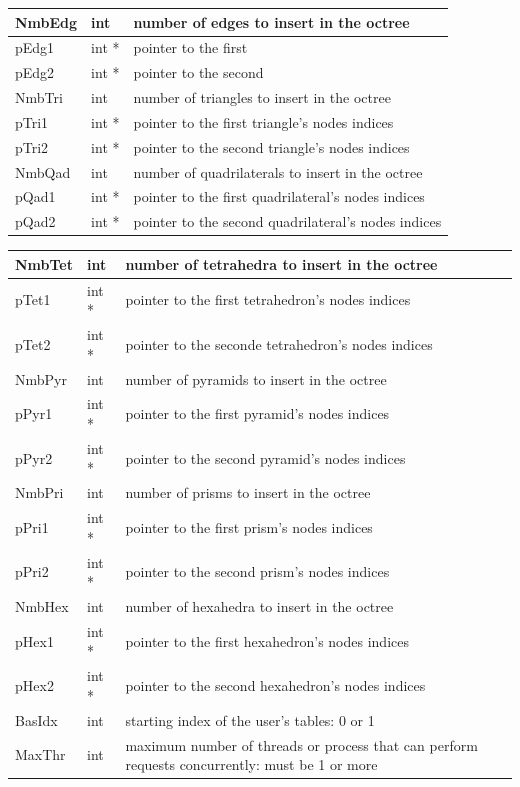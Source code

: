 \documentclass[a4paper,12pt]{article}
\begin{document}
\begin{tabular}{|m{2cm}|m{2cm}|m{10cm}|}
\hline
NmbEdg     & int      & number of edges to insert in the octree  \\
\hline
pEdg1      & int *    & pointer to the first  \\
\hline
pEdg2      & int *    & pointer to the second \\
\hline
NmbTri     & int      & number of triangles to insert in the octree \\
\hline
pTri1      & int *    & pointer to the first triangle's nodes indices \\
\hline
pTri2      & int *    & pointer to the second triangle's nodes indices \\
\hline
NmbQad     & int      & number of quadrilaterals to insert in the octree \\
\hline
pQad1      & int *    & pointer to the first quadrilateral's nodes indices \\
\hline
pQad2      & int *    & pointer to the second quadrilateral's nodes indices \\
\hline
\end{tabular}

\begin{tabular}{|m{2cm}|m{2cm}|m{10cm}|}
\hline
NmbTet     & int      & number of tetrahedra to insert in the octree \\
\hline
pTet1      & int *    & pointer to the first tetrahedron's nodes indices \\
\hline
pTet2      & int *    & pointer to the seconde tetrahedron's nodes indices \\
\hline
NmbPyr     & int      & number of pyramids to insert in the octree \\
\hline
pPyr1      & int *    & pointer to the first pyramid's nodes indices \\
\hline
pPyr2      & int *    & pointer to the second pyramid's nodes indices \\
\hline
NmbPri     & int      & number of prisms to insert in the octree \\
\hline
pPri1      & int *    & pointer to the first prism's nodes indices \\
\hline
pPri2      & int *    & pointer to the second prism's nodes indices \\
\hline
NmbHex     & int      & number of hexahedra to insert in the octree \\
\hline
pHex1      & int *    & pointer to the first hexahedron's nodes indices \\
\hline
pHex2      & int *    & pointer to the second hexahedron's nodes indices \\
\hline
BasIdx     & int      & starting index of the user's tables: 0 or 1 \\
\hline
MaxThr     & int      & maximum number of threads or process that can perform requests concurrently: must be 1 or more \\
\hline
\end{tabular}
\end{document}
